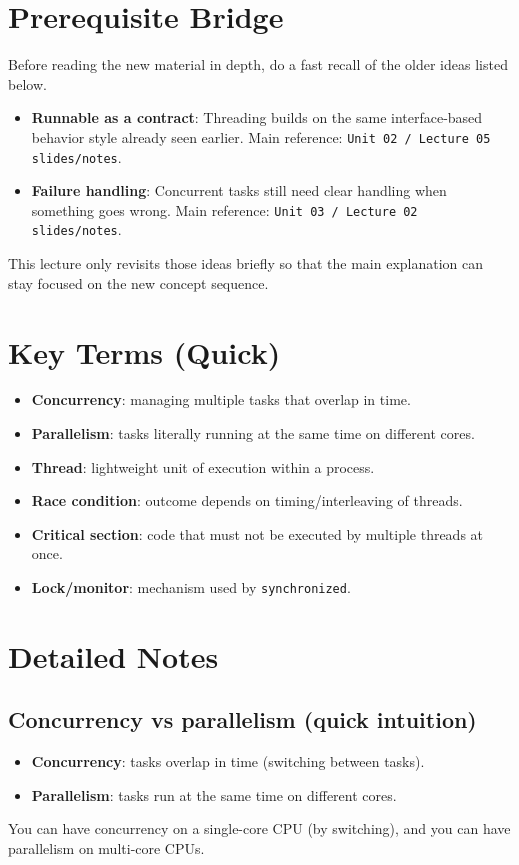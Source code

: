 \documentclass[11pt]{article}
\begin{document}
\section{Prerequisite Bridge}
Before reading the new material in depth, do a fast recall of the older ideas listed below.
\begin{itemize}
  \item \textbf{Runnable as a contract}: Threading builds on the same interface-based behavior style already seen earlier. Main reference: \texttt{Unit 02 / Lecture 05 slides/notes}.
  \item \textbf{Failure handling}: Concurrent tasks still need clear handling when something goes wrong. Main reference: \texttt{Unit 03 / Lecture 02 slides/notes}.
\end{itemize}
This lecture only revisits those ideas briefly so that the main explanation can stay focused on the new concept sequence.
\notesources{\OOPSUnitIIISources}

\section{Key Terms (Quick)}
\begin{itemize}
  \item \textbf{Concurrency}: managing multiple tasks that overlap in time.
  \item \textbf{Parallelism}: tasks literally running at the same time on different cores.
  \item \textbf{Thread}: lightweight unit of execution within a process.
  \item \textbf{Race condition}: outcome depends on timing/interleaving of threads.
  \item \textbf{Critical section}: code that must not be executed by multiple threads at once.
  \item \textbf{Lock/monitor}: mechanism used by \texttt{synchronized}.
\end{itemize}

\section{Detailed Notes}
\subsection{Concurrency vs parallelism (quick intuition)}
\begin{itemize}
  \item \textbf{Concurrency}: tasks overlap in time (switching between tasks).
  \item \textbf{Parallelism}: tasks run at the same time on different cores.
\end{itemize}
You can have concurrency on a single-core CPU (by switching), and you can have parallelism on multi-core CPUs.
\end{document}
